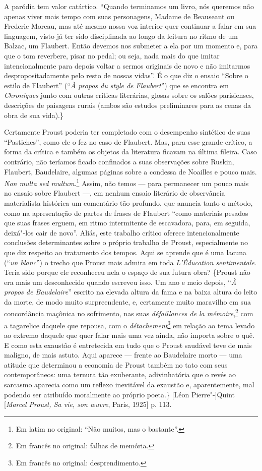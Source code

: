 A paródia tem valor catártico. ``Quando terminamos um livro, nós queremos
não apenas viver mais tempo com suas personagens, Madame de Beauseant ou
Frederic Moreau, mas até mesmo nossa voz interior quer continuar a falar
em sua linguagem, visto já ter sido disciplinada ao longo da leitura no
ritmo de um Balzac, um Flaubert. Então devemos nos submeter a ela por um
momento e, para que o tom reverbere, pisar no pedal; ou
seja, nada mais do que imitar intencionalmente para depois voltar a
sermos originais de novo e não imitarmos despropositadamente pelo resto
de nossas vidas''. É o que diz o ensaio ``Sobre o estilo de Flaubert''
(``\emph{À propos du style de Flaubert}'') que se encontra em
\emph{Chroniques} junto com outras críticas literárias, glosas sobre os
salões parisienses, descrições de paisagens rurais (ambos são estudos
preliminares para as cenas da obra de sua vida).\}

Certamente Proust poderia ter completado com o desempenho sintético de
suas ``Pastiches'', como ele o fez no caso de Flaubert. Mas, para esse
grande crítico, a forma da crítica e também os objetos da literatura
ficavam na última fileira. Caso contrário, não teríamos ficado
confinados a suas observações sobre Ruskin, Flaubert, Baudelaire,
algumas páginas sobre a condessa de Noailles e pouco mais. \emph{Non
multa sed multum}.\footnote{Em latim no original: ``Não muitos,
  mas o bastante''. \versal{[N. T.]}} Assim, não temos --- para permanecer um pouco mais
no ensaio sobre Flaubert ---, em nenhum ensaio literário de observância
materialista histórica um comentário tão profundo, que anuncia tanto o
método, como na apresentação de partes de frases de Flaubert ``como
materiais pesados que suas frases erguem, em ritmo intermitente de
escavadora, para, em seguida, deixá"-los cair de novo''. Aliás, este
trabalho crítico oferece intencionalmente conclusões determinantes sobre
o próprio trabalho de Proust, especialmente no que diz respeito ao
tratamento dos tempos. Aqui se aprende que é uma lacuna (``\emph{un
blanc}'') o trecho que Proust mais admira em toda \emph{L'Éducation
sentimentale}. Teria sido porque ele reconheceu nela o espaço de sua
futura obra? \{Proust não era mais um desconhecido quando escreveu isso.
Um ano e meio depois, ``\emph{À propos de Baudelaire}'' escrito na
elevada altura da fama e na baixa altura do leito da morte, de modo muito
surpreendente, e, certamente muito maravilho em sua concordância
maçônica no sofrimento, nas suas \emph{défaillances de la
mémoire},\footnote{Em francês no original: falhas de memória. \versal{[N. T.]}}
com a tagarelice daquele que repousa, com o \emph{détachement}\footnote{Em francês no original: desprendimento. \versal{[N. T.]}} em
relação ao tema levado ao extremo daquele que quer falar mais uma
vez ainda, não importa sobre o quê. E como esta exaustão é entretecida em
tudo que o Proust saudável teve de mais maligno, de mais astuto. Aqui
aparece --- frente ao Baudelaire morto --- uma atitude que determinou a
economia de Proust também no tato com seus contemporâneos: uma ternura
tão exuberante, adivinhatória que o revés ao sarcasmo aparecia como
um reflexo inevitável da exaustão e, aparentemente, mal podendo ser
atribuído moralmente ao próprio poeta.\} {[}Léon Pierre"-{]}Quint
{[}\emph{Marcel Proust, Sa vie, son \oe uvre}, Paris, 1925{]} p. 113.


